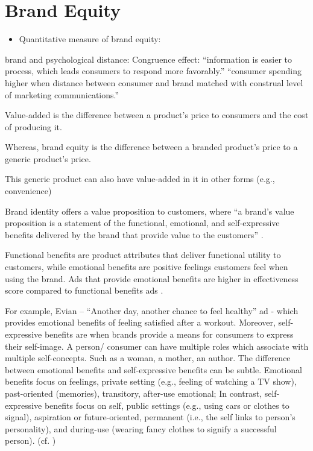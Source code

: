 \documentclass[
]{book}
\providecommand{\tightlist}{%
  \setlength{\itemsep}{0pt}\setlength{\parskip}{0pt}}
\begin{document}
\hypertarget{brand-equity}{%
\chapter{Brand Equity}\label{brand-equity}}

\begin{itemize}
\tightlist
\item
  Quantitative measure of brand equity: \citet{kamakura1993}
\end{itemize}

brand and psychological distance: Congruence effect: ``information is easier to process, which leads consumers to respond more favorably.'' \citep{Connors_2020} ``consumer spending higher when distance between consumer and brand matched with construal level of marketing communications.''

Value-added is the difference between a product's price to consumers and the cost of producing it.

Whereas, brand equity is the difference between a branded product's price to a generic product's price.

This generic product can also have value-added in it in other forms (e.g., convenience)

Brand identity offers a value proposition to customers, where ``a brand's value proposition is a statement of the functional, emotional, and self-expressive benefits delivered by the brand that provide value to the customers'' \citep[pp.95]{Aaker_1996}.

Functional benefits are product attributes that deliver functional utility to customers, while emotional benefits are positive feelings customers feel when using the brand. Ads that provide emotional benefits are higher in effectiveness score compared to functional benefits ads \citep[pp.98]{Aaker_1996}.

For example, Evian -- ``Another day, another chance to feel healthy'' ad - which provides emotional benefits of feeling satisfied after a workout. Moreover, self-expressive benefits are when brands provide a means for consumers to express their self-image. A person/ consumer can have multiple roles which associate with multiple self-concepts. Such as a woman, a mother, an author. The difference between emotional benefits and self-expressive benefits can be subtle. Emotional benefits focus on feelings, private setting (e.g., feeling of watching a TV show), past-oriented (memories), transitory, after-use emotional; In contrast, self-expressive benefits focus on self, public settings (e.g., using cars or clothes to signal), aspiration or future-oriented, permanent (i.e., the self links to person's personality), and during-use (wearing fancy clothes to signify a successful person). (cf. \citep[pp.99]{Aaker_1996})
\end{document}
